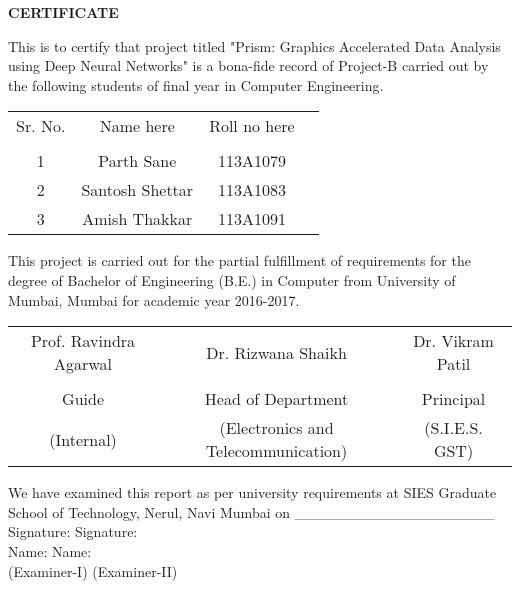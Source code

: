 

\newpage
\thispagestyle{empty}

\begin{center}
\large {\textbf{CERTIFICATE}}\\[0.5cm]
\end{center}

\normalsize This is to certify that project titled "Prism: Graphics Accelerated Data Analysis using Deep Neural Networks" is a bona-fide record of Project-B carried out by the following students of final year in Computer Engineering.\\[1.0cm]

\begin{table}[h]
\centering
\begin{tabular}{c c c c}
Sr. No. & Name here &  Roll no here\\
\\
1 & Parth Sane &  113A1079 \\ 
2 & Santosh Shettar &  113A1083\\
3 & Amish Thakkar &  113A1091 \\
\end{tabular}
\end{table}

\vspace{2cm}

This project is carried out for the partial fulfillment of requirements for the degree of Bachelor of Engineering (B.E.) in Computer from University of Mumbai, Mumbai for academic year 2016-2017.
\vspace{2cm}
\begin{table}[h]
	\centering
	\begin{tabular}{c c c}
		Prof. Ravindra Agarwal & Dr. Rizwana Shaikh &  Dr. Vikram Patil \\
		\\
		Guide & Head of Department & Principal \\ 
		\small (Internal) & \small (Electronics and Telecommunication) &  \small (S.I.E.S. GST)\\
		\hline
	\end{tabular}
\end{table}

We have examined this report as per university requirements at SIES Graduate School of Technology, Nerul, Navi Mumbai on 
\_\_\_\_\_\_\_\_\_\_\_\_\_\_\_\_\_\_\_\\


Signature: \hspace{5.7cm} Signature:  \\

Name:\hspace{6.5cm}  Name: \\

(Examiner-I)  \hspace{5cm}  (Examiner-II) \\

